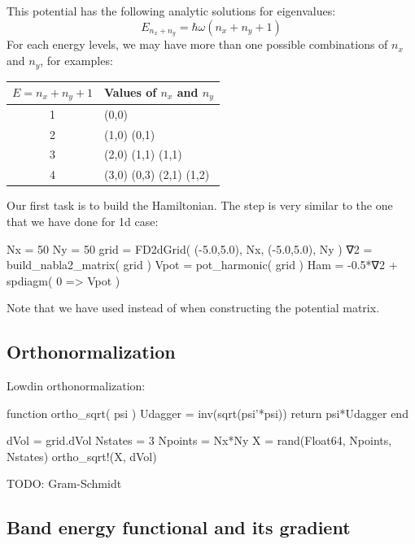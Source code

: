 This potential has the following analytic solutions for eigenvalues:
\begin{equation}
E_{n_{x} + n_{y}} = \hbar \omega \left( n_{x} + n_{y} + 1 \right)
\end{equation}
For each energy levels, we may have more than one possible combinations
of $n_x$ and $n_y$, for examples:

\begin{table}[h]
\centering
\begin{tabular}{|c|l|}
\hline
$E = n_x + n_y + 1$  &  Values of $n_x$ and $n_y$ \\
\hline
1                  &  (0,0) \\
2                  &  (1,0) (0,1) \\
3                  &  (2,0) (1,1) (1,1) \\
4                  &  (3,0) (0,3) (2,1) (1,2) \\
\hline
\end{tabular}
\end{table}

Our first task is to build the Hamiltonian. The step is very similar
to the one that we have done for 1d case:
\begin{juliacode}
Nx = 50
Ny = 50
grid = FD2dGrid( (-5.0,5.0), Nx, (-5.0,5.0), Ny )
∇2 = build_nabla2_matrix( grid )
Vpot = pot_harmonic( grid )
Ham = -0.5*∇2 + spdiagm( 0 => Vpot )
\end{juliacode}
Note that we have used  instead of
 when constructing the potential matrix.

\subsection{Orthonormalization}

Lowdin orthonormalization:
\begin{juliacode}
function ortho_sqrt( psi )
  Udagger = inv(sqrt(psi'*psi))
  return psi*Udagger
end
\end{juliacode}

\begin{juliacode}
dVol = grid.dVol
Nstates = 3
Npoints = Nx*Ny
X = rand(Float64, Npoints, Nstates)
ortho_sqrt!(X, dVol)
\end{juliacode}

TODO: Gram-Schmidt

\subsection{Band energy functional and its gradient}

